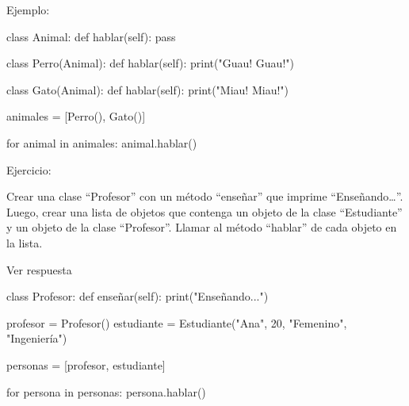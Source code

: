 \documentclass[
  a4paper,
  DIV=11,
  numbers=noendperiod,
  onepage,
  openany]{scrreprt}
\newenvironment{Shaded}{\begin{snugshade}}{\end{snugshade}}
\newcommand{\BuiltInTok}[1]{\textcolor[rgb]{0.00,0.23,0.31}{#1}}
\newcommand{\ControlFlowTok}[1]{\textcolor[rgb]{0.00,0.23,0.31}{#1}}
\newcommand{\DecValTok}[1]{\textcolor[rgb]{0.68,0.00,0.00}{#1}}
\newcommand{\KeywordTok}[1]{\textcolor[rgb]{0.00,0.23,0.31}{#1}}
\newcommand{\NormalTok}[1]{\textcolor[rgb]{0.00,0.23,0.31}{#1}}
\newcommand{\OperatorTok}[1]{\textcolor[rgb]{0.37,0.37,0.37}{#1}}
\newcommand{\StringTok}[1]{\textcolor[rgb]{0.13,0.47,0.30}{#1}}
\newcommand{\VariableTok}[1]{\textcolor[rgb]{0.07,0.07,0.07}{#1}}
\begin{document}
Ejemplo:

\begin{Shaded}
\begin{Highlighting}[]
\KeywordTok{class}\NormalTok{ Animal:}
    \KeywordTok{def}\NormalTok{ hablar(}\VariableTok{self}\NormalTok{):}
        \ControlFlowTok{pass}

\KeywordTok{class}\NormalTok{ Perro(Animal):}
    \KeywordTok{def}\NormalTok{ hablar(}\VariableTok{self}\NormalTok{):}
        \BuiltInTok{print}\NormalTok{(}\StringTok{"Guau! Guau!"}\NormalTok{)}

\KeywordTok{class}\NormalTok{ Gato(Animal):}
    \KeywordTok{def}\NormalTok{ hablar(}\VariableTok{self}\NormalTok{):}
        \BuiltInTok{print}\NormalTok{(}\StringTok{"Miau! Miau!"}\NormalTok{)}

\NormalTok{animales }\OperatorTok{=}\NormalTok{ [Perro(), Gato()]}

\ControlFlowTok{for}\NormalTok{ animal }\KeywordTok{in}\NormalTok{ animales:}
\NormalTok{    animal.hablar()}
\end{Highlighting}
\end{Shaded}

Ejercicio:

Crear una clase ``Profesor'' con un método ``enseñar'' que imprime
``Enseñando\ldots{}''. Luego, crear una lista de objetos que contenga un
objeto de la clase ``Estudiante'' y un objeto de la clase ``Profesor''.
Llamar al método ``hablar'' de cada objeto en la lista.

Ver respuesta

\begin{Shaded}
\begin{Highlighting}[]
\KeywordTok{class}\NormalTok{ Profesor:}
    \KeywordTok{def}\NormalTok{ enseñar(}\VariableTok{self}\NormalTok{):}
        \BuiltInTok{print}\NormalTok{(}\StringTok{"Enseñando..."}\NormalTok{)}

\NormalTok{profesor }\OperatorTok{=}\NormalTok{ Profesor()}
\NormalTok{estudiante }\OperatorTok{=}\NormalTok{ Estudiante(}\StringTok{"Ana"}\NormalTok{, }\DecValTok{20}\NormalTok{, }\StringTok{"Femenino"}\NormalTok{, }\StringTok{"Ingeniería"}\NormalTok{)}

\NormalTok{personas }\OperatorTok{=}\NormalTok{ [profesor, estudiante]}

\ControlFlowTok{for}\NormalTok{ persona }\KeywordTok{in}\NormalTok{ personas:}
\NormalTok{    persona.hablar()}
\end{Highlighting}
\end{Shaded}
\end{document}
